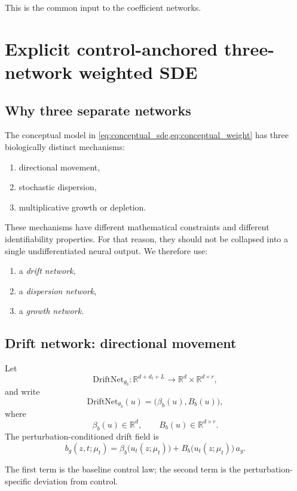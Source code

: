 \documentclass[11pt]{article}
\newcommand{\R}{\mathbb{R}}
\begin{document}
This is the common input to the coefficient networks.

\section{Explicit control-anchored three-network weighted SDE}

\subsection{Why three separate networks}

The conceptual model in \cref{eq:conceptual_sde,eq:conceptual_weight} has three biologically distinct mechanisms:
\begin{enumerate}[label=(\roman*),leftmargin=2.2em]
    \item directional movement,
    \item stochastic dispersion,
    \item multiplicative growth or depletion.
\end{enumerate}
These mechanisms have different mathematical constraints and different identifiability properties. For that reason, they should not be collapsed into a single undifferentiated neural output. We therefore use:
\begin{enumerate}[label=(\arabic*),leftmargin=2.2em]
    \item a \emph{drift network},
    \item a \emph{dispersion network},
    \item a \emph{growth network}.
\end{enumerate}

\subsection{Drift network: directional movement}

Let
\[
\mathrm{DriftNet}_{\theta_b} :
\R^{d+d_t+L}
\to
\R^d \times \R^{d\times r},
\]
and write
\[
\mathrm{DriftNet}_{\theta_b}(u)=\big(\beta_b(u),B_b(u)\big),
\]
where
\[
\beta_b(u)\in\R^d,
\qquad
B_b(u)\in\R^{d\times r}.
\]
The perturbation-conditioned drift field is
\begin{equation}
b_g(z,t;\mu_t)
=
\beta_b\!\big(u_t(z;\mu_t)\big)
+
B_b\!\big(u_t(z;\mu_t)\big)\,a_g.
\label{eq:drift_total}
\end{equation}

The first term is the baseline control law; the second term is the perturbation-specific deviation from control.
\end{document}
